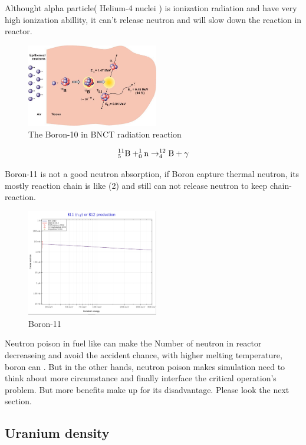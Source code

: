 \documentclass[final,10pt,times,twocolumn]{elsarticle}
\begin{document}
Althought alpha particle( Helium-4 nuclei ) is ionization radiation and have very high ionization abillity, it can't release neutron and will slow down the reaction in reactor.\\

\begin{figure}[ht]
    \centering
    \includegraphics[width = 5.75cm]{BNCT.png}
    \caption{The Boron-10 in BNCT radiation reaction\cite{Kasatov_2016} }
\end{figure}

\begin{equation}
    ^{11}_{5}\ce{B} + ^{1}_{0}\ce{n} \rightarrow ^{12}_{4}\ce{B} + \gamma
\end{equation}

Boron-11 is not a good neutron absorption, if Boron capture thermal neutron, its mostly reaction chain is like (2) and still can not release neutron to keep chain-reaction.

\begin{figure}[ht]
    \centering
    \includegraphics[width = 5.75cm]{Boron-11_Gamma.png}
    \caption{Boron-11 \cite{Kasatov_2016} }
\end{figure}

Neutron poison in fuel like  can make the Number of neutron in reactor decreaseing and avoid the accident chance, with higher melting temperature, boron can . But in the other hands, neutron poison makes simulation need to think about more circumstance and finally interface the critical operation's problem. But  more benefits make up for its disadvantage. Please look the next section.

\subsection{Uranium density}
\end{document}
